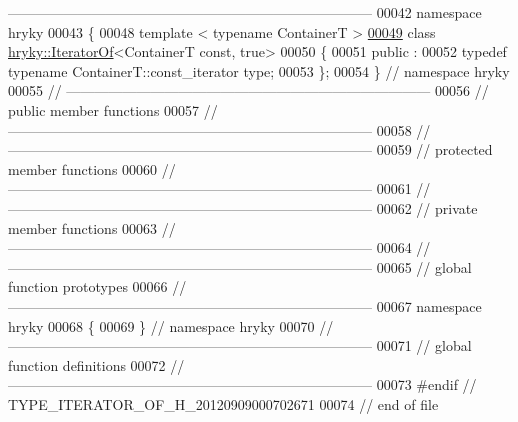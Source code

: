\begin{DoxyCode}
{      ------------------------------------------------------------------------------}
00042 \textcolor{keyword}{namespace }hryky
00043 \{
00048 \textcolor{keyword}{template} < \textcolor{keyword}{typename} ContainerT >
\hypertarget{type__iterator__of_8h_source_l00049}{}\hyperlink{classhryky_1_1hryky_1_1_iterator_of_3_01_container_t_01const_00_01true_01_4}{00049} \textcolor{keyword}{class }\hyperlink{classhryky_1_1_iterator_of}{hryky::IteratorOf}<ContainerT const, true>
00050 \{
00051 \textcolor{keyword}{public} :
00052     \textcolor{keyword}{typedef} \textcolor{keyword}{typename} ContainerT::const\_iterator type;
00053 \};
00054 \} \textcolor{comment}{// namespace hryky}
00055 \textcolor{comment}{//
      ------------------------------------------------------------------------------}
00056 \textcolor{comment}{// public member functions}
00057 \textcolor{comment}{//
      ------------------------------------------------------------------------------}
00058 \textcolor{comment}{//
      ------------------------------------------------------------------------------}
00059 \textcolor{comment}{// protected member functions}
00060 \textcolor{comment}{//
      ------------------------------------------------------------------------------}
00061 \textcolor{comment}{//
      ------------------------------------------------------------------------------}
00062 \textcolor{comment}{// private member functions}
00063 \textcolor{comment}{//
      ------------------------------------------------------------------------------}
00064 \textcolor{comment}{//
      ------------------------------------------------------------------------------}
00065 \textcolor{comment}{// global function prototypes}
00066 \textcolor{comment}{//
      ------------------------------------------------------------------------------}
00067 \textcolor{keyword}{namespace }hryky
00068 \{
00069 \} \textcolor{comment}{// namespace hryky}
00070 \textcolor{comment}{//
      ------------------------------------------------------------------------------}
00071 \textcolor{comment}{// global function definitions}
00072 \textcolor{comment}{//
      ------------------------------------------------------------------------------}
00073 \textcolor{preprocessor}{#endif // TYPE\_ITERATOR\_OF\_H\_20120909000702671}
00074 \textcolor{preprocessor}{}\textcolor{comment}{// end of file}
\end{DoxyCode}
